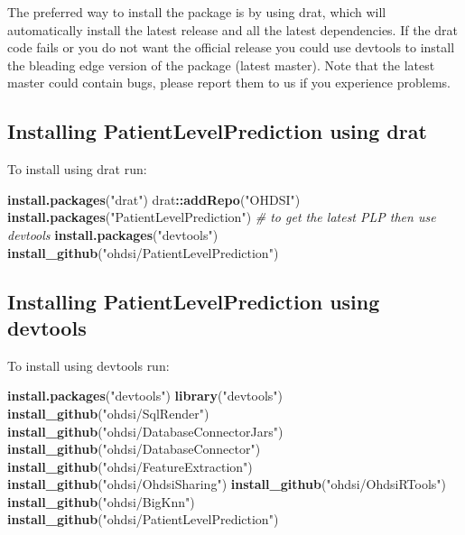 \documentclass[]{article}
\newenvironment{Shaded}{\begin{snugshade}}{\end{snugshade}}
\newcommand{\KeywordTok}[1]{\textcolor[rgb]{0.13,0.29,0.53}{\textbf{#1}}}
\newcommand{\StringTok}[1]{\textcolor[rgb]{0.31,0.60,0.02}{#1}}
\newcommand{\CommentTok}[1]{\textcolor[rgb]{0.56,0.35,0.01}{\textit{#1}}}
\newcommand{\OperatorTok}[1]{\textcolor[rgb]{0.81,0.36,0.00}{\textbf{#1}}}
\newcommand{\NormalTok}[1]{#1}
\begin{document}
The preferred way to install the package is by using drat, which will
automatically install the latest release and all the latest
dependencies. If the drat code fails or you do not want the official
release you could use devtools to install the bleading edge version of
the package (latest master). Note that the latest master could contain
bugs, please report them to us if you experience problems.

\subsection{Installing PatientLevelPrediction using
drat}\label{installing-patientlevelprediction-using-drat}

To install using drat run:

\begin{Shaded}
\begin{Highlighting}[]
\KeywordTok{install.packages}\NormalTok{(}\StringTok{"drat"}\NormalTok{)}
\NormalTok{drat}\OperatorTok{::}\KeywordTok{addRepo}\NormalTok{(}\StringTok{"OHDSI"}\NormalTok{)}
\KeywordTok{install.packages}\NormalTok{(}\StringTok{"PatientLevelPrediction"}\NormalTok{)}
\CommentTok{# to get the latest PLP then use devtools}
\KeywordTok{install.packages}\NormalTok{(}\StringTok{"devtools"}\NormalTok{)}
\KeywordTok{install_github}\NormalTok{(}\StringTok{"ohdsi/PatientLevelPrediction"}\NormalTok{) }
\end{Highlighting}
\end{Shaded}

\subsection{Installing PatientLevelPrediction using
devtools}\label{installing-patientlevelprediction-using-devtools}

To install using devtools run:

\begin{Shaded}
\begin{Highlighting}[]
\KeywordTok{install.packages}\NormalTok{(}\StringTok{"devtools"}\NormalTok{)}
\KeywordTok{library}\NormalTok{(}\StringTok{"devtools"}\NormalTok{)}
\KeywordTok{install_github}\NormalTok{(}\StringTok{"ohdsi/SqlRender"}\NormalTok{) }
\KeywordTok{install_github}\NormalTok{(}\StringTok{"ohdsi/DatabaseConnectorJars"}\NormalTok{) }
\KeywordTok{install_github}\NormalTok{(}\StringTok{"ohdsi/DatabaseConnector"}\NormalTok{) }
\KeywordTok{install_github}\NormalTok{(}\StringTok{"ohdsi/FeatureExtraction"}\NormalTok{)}
\KeywordTok{install_github}\NormalTok{(}\StringTok{"ohdsi/OhdsiSharing"}\NormalTok{) }
\KeywordTok{install_github}\NormalTok{(}\StringTok{"ohdsi/OhdsiRTools"}\NormalTok{) }
\KeywordTok{install_github}\NormalTok{(}\StringTok{"ohdsi/BigKnn"}\NormalTok{)  }
\KeywordTok{install_github}\NormalTok{(}\StringTok{"ohdsi/PatientLevelPrediction"}\NormalTok{) }
\end{Highlighting}
\end{Shaded}
\end{document}
